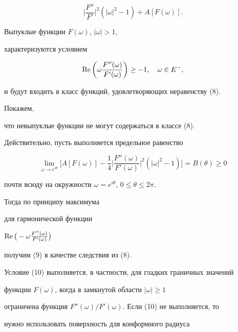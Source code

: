 \begin{pf}
\begin{equation}
\bigg|\frac{F''}{F'}\bigg|^2(|\omega|^2-1)+A[F(\omega)]. 


\end{equation} 


 


Выпуклые функции $F(\omega)$, $|\omega|>1$, 


характеризуются условием 


\begin{equation} 


\re\bigg(\omega\frac{F''(\omega)}{F'(\omega)}\bigg) 


\ge-1,\quad \omega\in E^-, 


\end{equation} 


и будут входить в класс функций, удовлетворяющих неравенству (8). 


Покажем, 


что невыпуклые функции не могут содержаться в классе (8). 


 


Действительно, пусть выполняется предельное равенство 


\begin{equation} 


\lim_{\omega\to e^{i\theta}}\bigg[A[F(\omega)]-\frac{1}{4} 


\bigg|\frac{F''(\omega)}{F'(\omega)}\bigg|^2 


(|\omega|^2-1)\bigg]=B(\theta)\ge0 


\end{equation} 


почти всюду на окружности $\omega=e^{i\theta}$, $0\le\theta\le2\pi$. 


Тогда по принципу максимума 


для гармонической функции 


$\operatorname{Re}\big(-\omega\frac{F''(\omega)}{F'(\omega)}\big)$ 


получим (9) в качестве следствия из (8). 


 


Условие (10) выполняется, в частности, для гладких граничных значений 


функции $F(\omega)$, когда в замкнутой области $|\omega|\ge1$ 


ограничена функция $F''(\omega)/F'(\omega)$. Если (10) не выполняется, то 


нужно использовать поверхность для конформного радиуса 



\end{pf}
